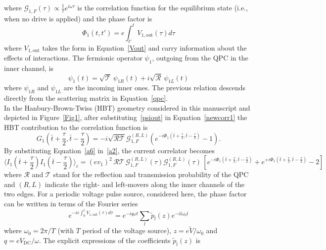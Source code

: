 \documentclass[12pt]{iopart}
\begin{document}
where $\mathcal{G}_{1,F}(\tau)\propto \frac{1}{\tau}e^{i\omega \tau}$ is the correlation function for the equilibrium state (i.e., when no drive is applied) and the phase factor is
\begin{equation}
    \Phi_1(t,t')=e\int_{t'}^{t} V_{1,\mathrm{out}}(\tau) d\tau
\end{equation}
where $V_{1,\mathrm{out}}$ takes the form in Equation~\eqref{Vout} and carry information about the effects of interactions. The fermionic operator $\psi_1$, outgoing from the QPC in the inner channel, is
\begin{equation}
    \psi_1(t)=\sqrt{\mathcal{T}}\,\psi_{1R}(t)+i\sqrt{\mathcal{R}}\,\psi_{1L}(t)
    \label{psiout}
\end{equation}
where $\psi_{1R}$ and $\psi_{1L}$ are the incoming inner ones. The previous relation descends directly from the scattering matrix in Equation~\eqref{qpc}.\\
In the Hanbury-Brown-Twiss (HBT) geometry considered in this manuscript and depicted in Figure~\ref{Fig1}, after substituting~\eqref{psiout} in Equation~\eqref{newcorr1} the HBT contribution to the correlation function is 
\begin{equation}
    G_1(\bar{t}+\frac{\tau}{2},\bar{t}-\frac{\tau}{2})=-i\sqrt{\mathcal{R}\mathcal{T}}\mathcal{G}^{(R,L)}_{1,F}(e^{-i\Phi_1(\bar{t}+\frac{\tau}{2},\bar{t}-\frac{\tau}{2})}-1).
    \label{a6}
\end{equation}
By substituting Equation~\eqref{a6} in~\eqref{a2}, the current correlator becomes 
\begin{equation}
    \langle I_1(\bar{t}+\frac{\tau}{2})I_1(\bar{t}-\frac{\tau}{2})\rangle_c=(e v_1)^2\, \mathcal{R}\mathcal{T}\, \mathcal{G}_{1,F}^{(R,L)}(\tau)\mathcal{G}_{1,F}^{(R,L)}(\tau)\,\left[e^{-i \Phi_{1}(\bar{t}+\frac{\tau}{2},\bar{t}-\frac{\tau}{2})}+e^{+i \Phi_{1}(\bar{t}+\frac{\tau}{2},\bar{t}-\frac{\tau}{2})}-2\right]
\end{equation}
where $\mathcal{R}$ and $\mathcal{T}$ stand for the reflection and transmission probability of the QPC and $(R,L)$ indicate the right- and left-movers along the inner channels of the two edges. For a periodic voltage pulse source, considered here, the phase factor can be written in terms of the Fourier series
\begin{equation}
    e^{-ie\int_{0}^{t}V_{1,\mathrm{out}}(\tau)d\tau}=e^{-i q\omega t}\sum_{l} \widetilde{p}_{l}(z)e^{-i l\omega_0 t}
    \label{fourier}
\end{equation}
where $\omega_0=2\pi/T$ (with $T$ period of the voltage source), $z=e\tilde{V}/\omega_0$ and $q=eV_{\mathrm{DC}}/\omega$. The explicit expressions of the coefficients $\widetilde{p}_{l}(z)$ is
\end{document}
